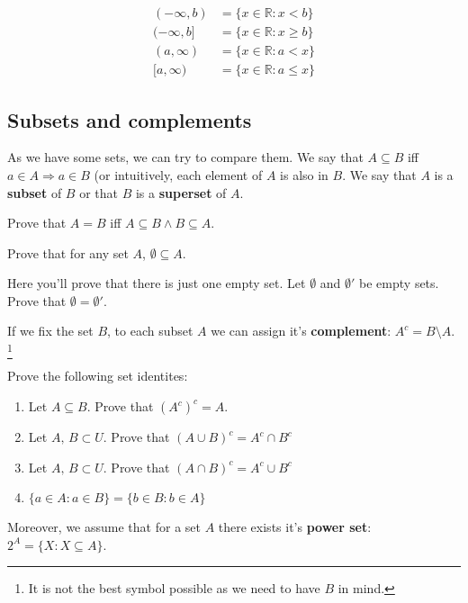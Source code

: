 \begin{align*}
	(-\infty,b) &= \{x\in \mathbb R : x < b\}\\
	(-\infty,b] &= \{x\in \mathbb R : x \ge b\}\\
	(a,\infty)  &= \{x\in \mathbb R : a < x\}\\
	[a,\infty)  &= \{x\in \mathbb R : a \le x\}
\end{align*}

\subsection{Subsets and complements}
\noindent As we have some sets, we can try to compare them. We say that $A\subseteq B$ iff
$a\in A\Rightarrow a\in B$ (or intuitively, each element of $A$ is also in $B$. We say that $A$ is
a \textbf{subset} of $B$ or that $B$ is a \textbf{superset} of $A$.

\begin{prob}
	Prove that $A=B$ iff $A\subseteq B \wedge B\subseteq A.$
\end{prob}

\begin{prob}
	Prove that for any set $A$, $\emptyset \subseteq A$.
\end{prob}

\begin{prob}
  Here you'll prove that there is just one empty set.
	Let $\emptyset$ and $\emptyset'$ be empty sets. Prove that $\emptyset=\emptyset'$.
\end{prob}

\noindent If we fix the set $B$, to each subset $A$
we can assign it's \textbf{complement}: $A^c=B\setminus A$. \footnote{It is not the best symbol possible as we need to have $B$ in mind.}

\begin{prob}
	Prove the following set identites:
	\begin{enumerate}
		\item Let $A\subseteq B.$ Prove that $(A^c)^c = A$.
		\item Let $A,\, B\subset U$. Prove that $(A\cup B)^c = A^c\cap B^c$
		\item Let $A,\, B\subset U$. Prove that $(A\cap B)^c = A^c\cup B^c$
		\item $\{a\in A : a\in B\} = \{b\in B : b\in A\}$
	\end{enumerate}
\end{prob}

Moreover, we assume that for a set $A$ there exists it's \textbf{power set}:
$2^A = \{X : X\subseteq A\}$.

